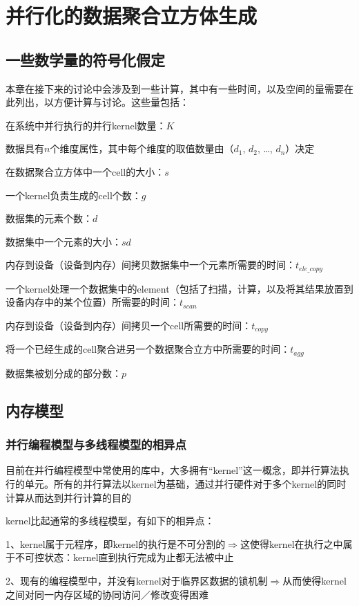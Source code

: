 \chapter{并行化的数据聚合立方体生成}
\section{一些数学量的符号化假定}

本章在接下来的讨论中会涉及到一些计算，其中有一些时间，以及空间的量需要在此列出，以方便计算与讨论。这些量包括：

在系统中并行执行的并行kernel数量：$K$

数据具有$n$个维度属性，其中每个维度的取值数量由（$d_1$, $d_2$, …, $d_n$）决定

在数据聚合立方体中一个cell的大小：$s$

一个kernel负责生成的cell个数：$g$

数据集的元素个数：$d$

数据集中一个元素的大小：$sd$

内存到设备（设备到内存）间拷贝数据集中一个元素所需要的时间：$t_{ele\_copy}$

一个kernel处理一个数据集中的element（包括了扫描，计算，以及将其结果放置到设备内存中的某个位置）所需要的时间：$t_{scan}$

内存到设备（设备到内存）间拷贝一个cell所需要的时间：$t_{copy}$

将一个已经生成的cell聚合进另一个数据聚合立方中所需要的时间：$t_{agg}$

数据集被划分成的部分数：$p$

\section{内存模型}

\subsection{并行编程模型与多线程模型的相异点}
目前在并行编程模型中常使用的库中，大多拥有“kernel”这一概念，即并行算法执行的单元。所有的并行算法以kernel为基础，通过并行硬件对于多个kernel的同时计算从而达到并行计算的目的

kernel比起通常的多线程模型，有如下的相异点：

1、kernel属于元程序，即kernel的执行是不可分割的{\quad$\Rightarrow$\quad}这使得kernel在执行之中属于不可控状态：kernel直到执行完成为止都无法被中止

2、现有的编程模型中，并没有kernel对于临界区数据的锁机制{\quad$\Rightarrow$\quad}从而使得kernel之间对同一内存区域的协同访问／修改变得困难

